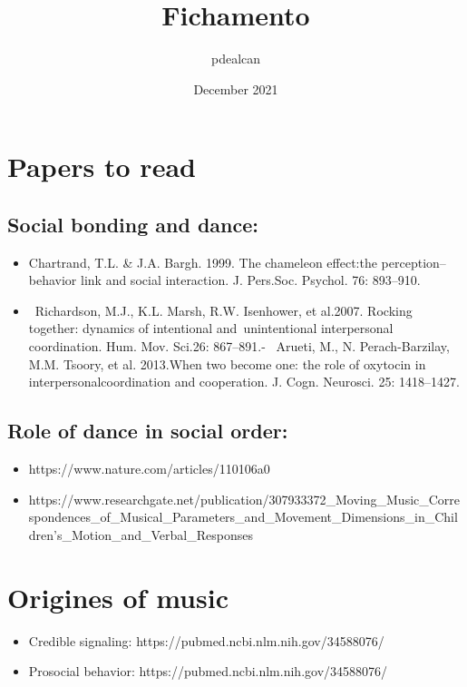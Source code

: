 \documentclass{article}
\title{Fichamento}
\author{pdealcan}
\date{December 2021}
\begin{document}
\maketitle

\section{Papers to read}

\subsection{Social bonding and dance:}

\begin{itemize}
  \item Chartrand, T.L. \&  J.A. Bargh. 1999. The chameleon effect:the perception–behavior link and social interaction. J. Pers.Soc. Psychol. 76: 893–910.
  \item Richardson, M.J., K.L. Marsh, R.W. Isenhower, et al.2007. Rocking together: dynamics of intentional and unintentional interpersonal coordination. Hum. Mov. Sci.26: 867–891.-  Arueti, M., N. Perach-Barzilay, M.M. Tsoory, et al. 2013.When two become one: the role of oxytocin in interpersonalcoordination and cooperation. J. Cogn. Neurosci. 25: 1418–1427.
\end{itemize}

\subsection{Role of dance in social order:}

\begin{itemize}
  \item https://www.nature.com/articles/110106a0
  \item https://www.researchgate.net/publication/307933372_Moving_Music_Correspondences_of_Musical_Parameters_and_Movement_Dimensions_in_Children's_Motion_and_Verbal_Responses
\end{itemize}

\section{Origines of music}
\begin{itemize}
  \item Credible signaling: https://pubmed.ncbi.nlm.nih.gov/34588076/
  \item Prosocial behavior: https://pubmed.ncbi.nlm.nih.gov/34588076/
\end{itemize}
\end{document}
